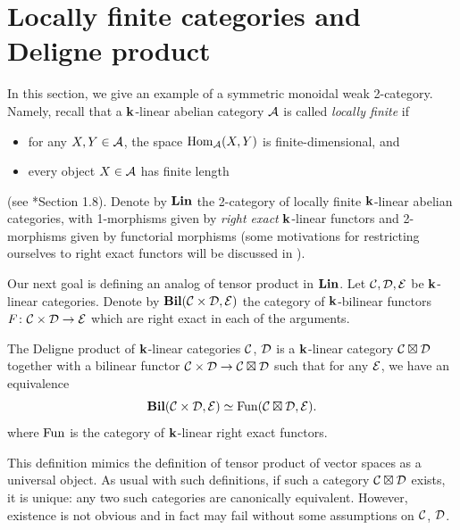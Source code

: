 \section{Locally finite categories and Deligne product}
\label{s:deligne-product}
In this section, we give an example of a symmetric monoidal weak 2-category.
Namely, recall that a $\mathbf{k}$-linear abelian category $\mathcal{A}$ is called
\emph{locally finite} if
\begin{itemize}
    \item for any $X,Y\in \mathcal{A}$, the space $\operatorname{Hom}_{\mathcal{A}}(X,Y)$ is
      finite-dimensional, and
    \item every object $X\in \mathcal{A}$ has finite length
\end{itemize}
(see *{Section 1.8}). Denote by $\mathbf{Lin}$ the 2-category
of locally finite $\mathbf{k}$-linear abelian categories, with 1-morphisms given by
\emph{right exact} $\mathbf{k}$-linear functors and 2-morphisms given by functorial
morphisms (some motivations for restricting ourselves to right exact
functors will be discussed in ). %


Our next goal is defining an analog of tensor product in $\mathbf{Lin}$.
Let $\mathcal{C}, \mathcal{D}, \mathcal{E}$ be $\mathbf{k}$-linear categories. Denote by
$\mathbf{Bil}(\mathcal{C}\times\mathcal{D}, \mathcal{E})$ the category of $\mathbf{k}$-bilinear functors $F\colon
\mathcal{C}\times\mathcal{D}\to \mathcal{E}$ which are right exact in each of the arguments.

\begin{definition}\label{d:deligne-product}
  The Deligne product of $\mathbf{k}$-linear categories $\mathcal{C}$, $\mathcal{D}$ is a
  $\mathbf{k}$-linear category $\mathcal{C}\boxtimes \mathcal{D}$ together with a bilinear functor
  $\mathcal{C}\times\mathcal{D}\to \mathcal{C}\boxtimes\mathcal{D}$ such that for any $\mathcal{E}$, we have
  an equivalence
  $$
    \mathbf{Bil}(\mathcal{C}\times\mathcal{D}, \mathcal{E})\simeq \operatorname{Fun}(\mathcal{C}\boxtimes\mathcal{D}, \mathcal{E}).
  $$
  where $\operatorname{Fun}$ is the category of $\mathbf{k}$-linear right exact functors.
\end{definition}
This definition mimics the definition of tensor product of vector spaces as a
universal object. As usual with such definitions, if such a category
$\mathcal{C}\boxtimes\mathcal{D}$ exists, it is unique: any two such categories are
canonically equivalent. However, existence is not obvious and in fact may fail
without some assumptions on $\mathcal{C}$, $\mathcal{D}$.

